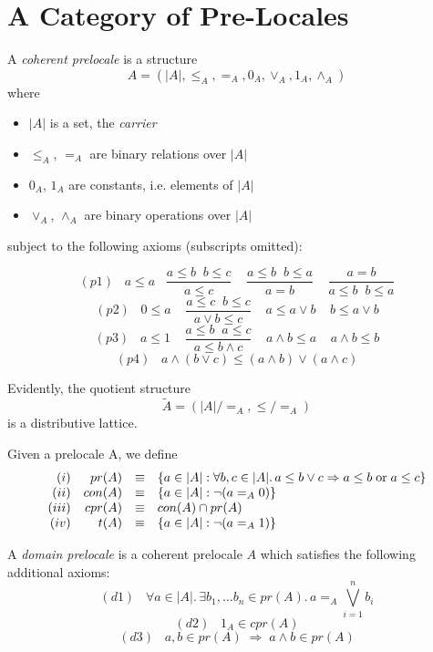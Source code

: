 \section{A Category of Pre-Locales}
\begin{definition} 
{\rm A {\em coherent prelocale} is a structure
\[A = (|A|, \leq_{A}, =_{A}, 0_{A}, \vee_{A}, 1_{A}, \wedge_{A}) \]
where \begin{itemize}
\item $|A|$ is a set, the {\it carrier}
\item $\leq_{A}$, $=_{A}$ are binary relations over $|A|$
\item $0_{A}$, $1_{A}$ are constants, i.e. elements of $|A|$
\item $\vee_{A}$, $\wedge_{A}$ are binary operations over $|A|$
\end{itemize}
subject to the following axioms (subscripts omitted):}
\[(p1) \;\;\; a \leq a \;\;\; \frac{a \leq b \;\; b \leq c}{a \leq c} \;\;\;\;     \frac{a \leq b \;\; b \leq a}{a = b} \;\;\;\; \frac{a = b}{a \leq b \;\; b \leq a} \]
\[(p2) \;\;\; 0 \leq a \;\;\;\; \frac{a \leq c \;\; b \leq c}{a \vee b \leq c} \;\;\;\; a \leq a \vee b \;\;\;\; b \leq a \vee b \]
\[(p3) \;\;\; a \leq 1 \;\;\;\; \frac{a \leq b \;\; a \leq c}{a \leq b \wedge c} \;\;\;\; a \wedge b \leq a \;\;\;\; a \wedge b \leq b \]
\[(p4) \;\;\; a \wedge (b \vee c) \leq (a \wedge b) \vee (a \wedge c) \]
\end{definition}
Evidently, the quotient structure
\[ \tilde{A} = (|A|/{=_{A}}, {\leq} /{=_{A}}) \]
is a distributive lattice.
\begin{definition} 
{\rm Given a prelocale A, we define}
\[\begin{array}{rrcl}
(i) & pr(A) & \equiv & \{a \in |A| : \forall b, c \in |A|.\, a \leq b \vee c \Rightarrow a \leq b \; {\rm or} \; a \leq c \} \\
(ii) & con(A) & \equiv & \{a \in |A| : \neg (a =_{A} 0) \} \\
(iii) & cpr(A) & \equiv & con(A) \cap pr(A) \\
(iv) & t(A) & \equiv & \{a \in |A| : \neg (a =_{A} 1) \}
\end{array} \]
\end{definition}
\begin{definition} 
{\rm A {\it domain prelocale} is a coherent prelocale $A$ which satisfies 
the following additional axioms:}
\[ (d1) \;\;\; \forall a \in |A| . \, \exists b_{1}, \ldots b_{n} \in pr(A). \, a =_{A} \bigvee_{i=1}^{n}b_{i} \]
\[ (d2) \;\;\; 1_{A} \in cpr(A) \]
\[ (d3) \;\;\; a, b \in pr(A) \; \Rightarrow \; a \wedge b \in pr(A) \]
\end{definition}
